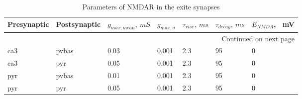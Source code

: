 \begin{longtable}{lllllll}
\caption{Parameters of NMDAR in the exite synapses}\label{nmda_parameters}\\
\toprule
 Presynaptic & Postsynaptic & $g_{max, mean}, \ mS$ & $g_{max, \sigma}$ & $\tau_{rise}, \ ms$ & $\tau_{decay}, \ ms$ & $E_{NMDA}$, \ mV \\
\midrule
\endhead
\midrule
\multicolumn{7}{r}{{Continued on next page}} \\
\midrule
\endfoot

\bottomrule
\endlastfoot
 ca3\ &        pvbas &     0.03 &    0.001 &  2.3 &    95 &     0 \\
 ca3\ &          pyr &     0.05 &    0.001 &  2.3 &    95 &     0 \\
         pyr &        pvbas &     0.01 &    0.001 &  2.3 &    95 &     0 \\
         pyr &          pyr &     0.05 &    0.001 &  2.3 &    95 &     0 \\
\end{longtable}
